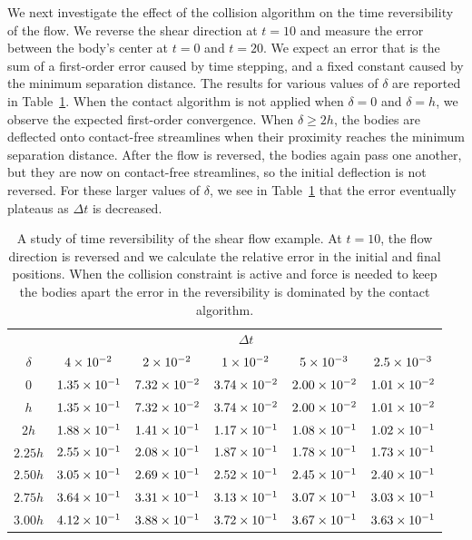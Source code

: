 \documentclass[preprint, 10pt]{elsarticle}
\begin{document}
We next investigate the effect of the collision algorithm on the time
reversibility of the flow. We reverse the shear direction at $t=10$ and
measure the error between the body's center at $t=0$ and $t=20$.  We
expect an error that is the sum of a first-order error caused by time
stepping, and a fixed constant caused by the minimum separation
distance.  The results for various values of $\delta$ are reported in
Table~\ref{tab:reverse}. When the contact algorithm is not applied
when $\delta=0$ and $\delta=h$, we observe the expected
first-order convergence.  When $\delta \geq 2h$, the bodies are
deflected onto contact-free streamlines when their proximity reaches the
minimum separation distance.  After the flow is reversed, the bodies
again pass one another, but they are now on contact-free streamlines, so
the initial deflection is not reversed.  For these larger values of
$\delta$, we see in Table~\ref{tab:reverse} that the error eventually
plateaus as $\Delta t$ is decreased.

\begin{table}[!h]
\begin{center}
\begin{tabular}{c| c c c c c}
$ $ & & & $\Delta t$ & &\\
$\delta$ & $4\times 10^{-2}$ &$ 2\times 10^{-2}$ & $1\times 10^{-2}$ & $5\times 10^{-3}$ & $2.5\times 10^{-3}$\\
\hline
0 & $1.35\times 10^{-1}$ & $7.32\times 10^{-2}$ & $3.74\times 10^{-2}$ & $2.00\times 10^{-2}$ & $1.01\times 10^{-2}$\\
$h$ & $1.35\times 10^{-1}$ & $7.32\times 10^{-2}$ & $3.74\times 10^{-2}$ & $2.00\times 10^{-2}$ & $1.01\times 10^{-2}$\\
$2h$ & $1.88\times 10^{-1}$ & $1.41\times 10^{-1}$ & $1.17\times 10^{-1}$ & $1.08\times 10^{-1}$ &
$1.02\times 10^{-1}$\\
$2.25h$ & $2.55\times 10^{-1}$ & $2.08\times 10^{-1}$ & $1.87\times 10^{-1}$ & $1.78\times 10^{-1}$ &
$1.73\times 10^{-1}$\\
$2.50h$ & $3.05\times 10^{-1}$ & $2.69\times 10^{-1}$ & $2.52\times 10^{-1}$ & $2.45\times 10^{-1}$ &
$2.40\times 10^{-1}$\\
$2.75h$ & $3.64\times 10^{-1}$ & $3.31\times 10^{-1}$ & $3.13\times 10^{-1}$ & $3.07\times 10^{-1}$ &
$3.03\times 10^{-1}$\\
$3.00h$ & $4.12\times 10^{-1}$ & $3.88\times 10^{-1}$ & $3.72\times 10^{-1}$ & $3.67\times 10^{-1}$ &
$3.63\times 10^{-1}$
\end{tabular}
\end{center}
\caption{A study of time reversibility of the shear flow example. At
$t=10$, the flow direction is reversed and we calculate the relative
error in the initial and final positions. When the collision constraint
is active and force is needed to keep the bodies apart the error in
the reversibility is dominated by the contact
algorithm.}\label{tab:reverse}
\end{table}
\end{document}
